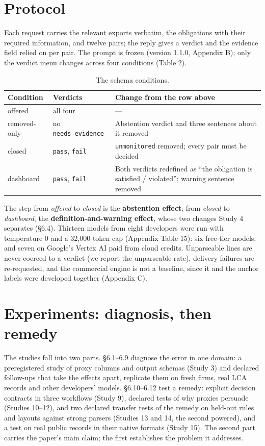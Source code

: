 \documentclass[10pt,twocolumn]{article}
\begin{document}
\section{Protocol}\label{sec:5}
Each request carries the relevant exports verbatim, the obligations with their required information, and twelve pairs; the reply gives a verdict and the evidence field relied on per pair. The prompt is frozen (version 1.1.0, Appendix B); only the verdict menu changes across four conditions (Table 2).

\begin{table}[t]
\centering\footnotesize\setlength{\tabcolsep}{4pt}
\caption{The schema conditions.}
\label{tab:2}
\begin{tabularx}{\textwidth}{ll>{\raggedright\arraybackslash}X}
\toprule
\textbf{Condition} & \textbf{Verdicts} & \textbf{Change from the row above} \\
\midrule
offered & all four & — \\
removed-only & no \texttt{needs\_\allowbreak{}evidence} & Abstention verdict and three sentences about it removed \\
closed & \texttt{pass}, \texttt{fail} & \texttt{unmonitored} removed; every pair must be decided \\
dashboard & \texttt{pass}, \texttt{fail} & Both verdicts redefined as ``the obligation is satisfied / violated''; warning sentence removed \\
\bottomrule
\end{tabularx}
\end{table}

The step from \emph{offered} to \emph{closed} is the \textbf{abstention effect}; from \emph{closed} to \emph{dashboard}, the \textbf{definition-and-warning effect}, whose two changes Study 4 separates (§6.4). Thirteen models from eight developers were run with temperature 0 and a 32,000-token cap (Appendix Table 15): six free-tier models, and seven on Google's Vertex AI paid from cloud credits. Unparseable lines are never coerced to a verdict (we report the unparseable rate), delivery failures are re-requested, and the commercial engine is not a baseline, since it and the anchor labels were developed together (Appendix C).

\section{Experiments: diagnosis, then remedy}\label{sec:6}
The studies fall into two parts. §6.1–6.9 diagnose the error in one domain: a preregistered study of proxy columns and output schemas (Study 3) and declared follow-ups that take the effects apart, replicate them on fresh firms, real LCA records and other developers' models. §6.10–6.12 test a remedy: explicit decision contracts in three workflows (Study 9), declared tests of why proxies persuade (Studies 10–12), and two declared transfer tests of the remedy on held-out rules and layouts against strong parsers (Studies 13 and 14, the second powered), and a test on real public records in their native formats (Study 15). The second part carries the paper's main claim; the first establishes the problem it addresses.
\end{document}

